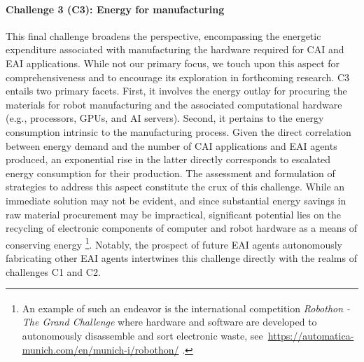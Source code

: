 \documentclass[12pt]{article}
\begin{document}
\paragraph*{\textbf{Challenge 3} (C3): Energy for manufacturing}
This final challenge broadens the perspective, encompassing the energetic expenditure associated with manufacturing the hardware required for CAI and EAI applications. While not our primary focus, we touch upon this aspect for comprehensiveness and to encourage its exploration in forthcoming research. C3 entails two primary facets. First, it involves the energy outlay for procuring the materials for robot manufacturing and the associated computational hardware (e.g., processors, GPUs, and AI servers). Second, it pertains to the energy consumption intrinsic to the manufacturing process. Given the direct correlation between energy demand and the number of CAI applications and EAI agents produced, an exponential rise in the latter directly corresponds to escalated energy consumption for their production. The assessment and formulation of strategies to address this aspect constitute the crux of this challenge. While an immediate solution may not be evident, and since substantial energy savings in raw material procurement may be impractical, significant potential lies on the recycling of electronic components of computer and robot hardware as a means of conserving energy \footnote{An example of such an endeavor is the international competition  \textit{Robothon\textsuperscript{\textregistered} - The Grand Challenge} where hardware and software are developed to autonomously disassemble and sort electronic waste, see~\url{https://automatica-munich.com/en/munich-i/robothon/} .}. Notably, the prospect of future EAI agents autonomously fabricating other EAI agents intertwines this challenge directly with the realms of challenges C1 and C2.

\end{document}
